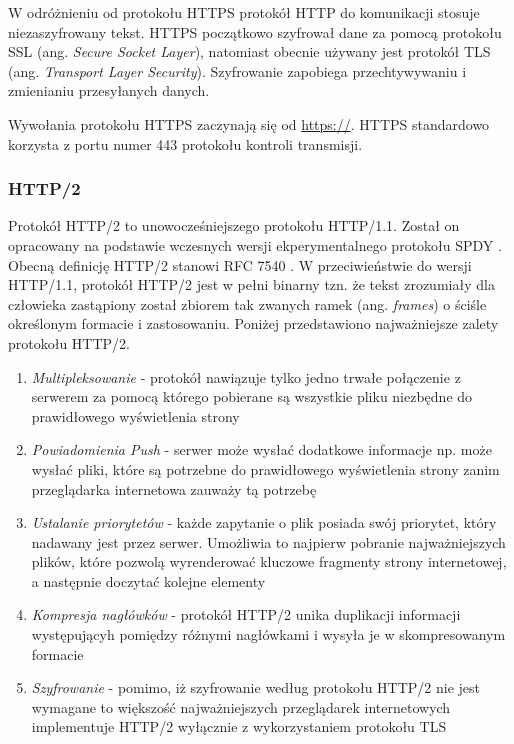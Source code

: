 \documentclass[polish, twoside, 12pt]{mwart}
\begin{document}
W odróżnieniu od protokołu HTTPS protokół HTTP do komunikacji stosuje niezaszyfrowany tekst. HTTPS początkowo szyfrował dane za pomocą protokołu SSL (ang. \emph{Secure Socket Layer}), natomiast obecnie używany jest protokół TLS (ang. \emph{Transport Layer Security}). Szyfrowanie zapobiega przechtywywaniu i zmienianiu przesyłanych danych. 

Wywołania protokołu HTTPS zaczynają się od \url{https://}. HTTPS standardowo korzysta z portu numer 443 protokołu kontroli transmisji. 

\subsubsection{HTTP/2} \label{http/2}

Protokół HTTP/2 to unowocześniejszego protokołu HTTP/1.1. Został on opracowany na podstawie wczesnych wersji ekperymentalnego protokołu SPDY \cite{spdy}. Obecną definicję HTTP/2 stanowi RFC 7540 \cite{rfc7540}. W przeciwieństwie do wersji HTTP/1.1, protokół HTTP/2 jest w pełni binarny tzn. że tekst zrozumiały dla człowieka zastąpiony został zbiorem tak zwanych ramek (ang. \emph{frames}) o ściśle określonym formacie i zastosowaniu. Poniżej przedstawiono najważniejsze zalety protokołu HTTP/2.

\begin{enumerate}
  \item \emph{Multipleksowanie} - protokół nawiązuje tylko jedno trwałe połączenie z serwerem za pomocą którego pobierane są wszystkie pliku niezbędne do prawidłowego wyświetlenia strony
  \item \emph{Powiadomienia Push} - serwer może wysłać dodatkowe informacje np. może wysłać pliki, które są potrzebne do prawidłowego wyświetlenia strony zanim przeglądarka internetowa zauważy tą potrzebę
  \item \emph{Ustalanie priorytetów} - każde zapytanie o plik posiada swój priorytet, który nadawany jest przez serwer. Umożliwia to najpierw pobranie najważniejszych plików, które pozwolą wyrenderować kluczowe fragmenty strony internetowej, a następnie doczytać kolejne elementy
  \item \emph{Kompresja nagłówków} - protokół HTTP/2 unika duplikacji informacji występującyh pomiędzy różnymi nagłówkami i wysyła je w skompresowanym formacie
  \item \emph{Szyfrowanie} - pomimo, iż szyfrowanie według protokołu HTTP/2 nie jest wymagane to większość najważniejszych przeglądarek internetowych implementuje HTTP/2 wyłącznie z wykorzystaniem protokołu TLS
\end{enumerate}
\end{document}
